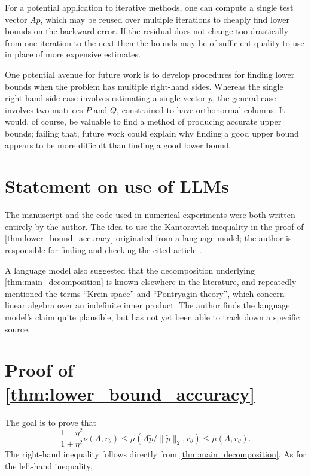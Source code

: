 \documentclass{article}
\begin{document}
For a potential application to iterative methods, one can compute a single test vector $Ap$, which may be reused over multiple iterations to cheaply find lower bounds on the backward error. If the residual does not change too drastically from one iteration to the next then the bounds may be of sufficient quality to use in place of more expensive estimates.

One potential avenue for future work is to develop procedures for finding lower bounds when the problem has multiple right-hand sides. Whereas the single right-hand side case involves estimating a single vector $p$, the general case involves two matrices $P$ and $Q$, constrained to have orthonormal columns. It would, of course, be valuable to find a method of producing accurate upper bounds; failing that, future work could explain why finding a good upper bound appears to be more difficult than finding a good lower bound.

\section*{Statement on use of LLMs}
The manuscript and the code used in numerical experiments were both written entirely by the author. The idea to use the Kantorovich inequality in the proof of \cref{thm:lower_bound_accuracy} originated from a language model; the author is responsible for finding and checking the cited article \cite{henrici1961two}.

A language model also suggested that the decomposition underlying \cref{thm:main_decomposition} is known elsewhere in the literature, and repeatedly mentioned the terms ``Krein space'' and ``Pontryagin theory'', which concern linear algebra over an indefinite inner product. The author finds the language model's claim quite plausible, but has not yet been able to track down a specific source. 


\appendix
\section{Proof of \cref{thm:lower_bound_accuracy}}\label{apx:lower_bound_accuracy}
The goal is to prove that
\begin{equation*}
    \frac{1-\eta^2}{1+\eta^2}\nu(A,r_\theta) \leq \mu(A\widetilde{p}/\|\widetilde{p}\|_2, r_\theta) \leq \mu(A, r_\theta).
\end{equation*}
The right-hand inequality follows directly from \cref{thm:main_decomposition}. As for the left-hand inequality, 
\end{document}
